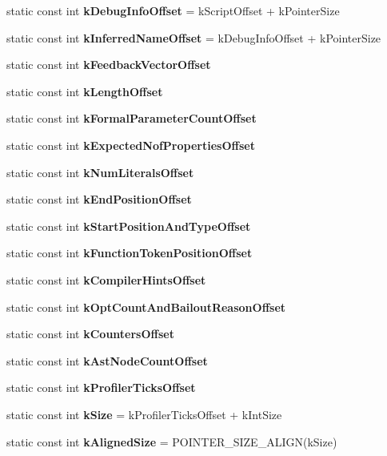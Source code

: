 \begin{DoxyCompactItemize}
\item 
\hypertarget{classv8_1_1internal_1_1_shared_function_info_a3e5e9653b37e7a05aeec489c67aa229a}{}static const int {\bfseries k\+Debug\+Info\+Offset} = k\+Script\+Offset + k\+Pointer\+Size\label{classv8_1_1internal_1_1_shared_function_info_a3e5e9653b37e7a05aeec489c67aa229a}

\item 
\hypertarget{classv8_1_1internal_1_1_shared_function_info_a537a45646dd6c58d4499c13d36239cc6}{}static const int {\bfseries k\+Inferred\+Name\+Offset} = k\+Debug\+Info\+Offset + k\+Pointer\+Size\label{classv8_1_1internal_1_1_shared_function_info_a537a45646dd6c58d4499c13d36239cc6}

\item 
static const int {\bfseries k\+Feedback\+Vector\+Offset}
\item 
static const int {\bfseries k\+Length\+Offset}
\item 
static const int {\bfseries k\+Formal\+Parameter\+Count\+Offset}
\item 
static const int {\bfseries k\+Expected\+Nof\+Properties\+Offset}
\item 
static const int {\bfseries k\+Num\+Literals\+Offset}
\item 
static const int {\bfseries k\+End\+Position\+Offset}
\item 
static const int {\bfseries k\+Start\+Position\+And\+Type\+Offset}
\item 
static const int {\bfseries k\+Function\+Token\+Position\+Offset}
\item 
static const int {\bfseries k\+Compiler\+Hints\+Offset}
\item 
static const int {\bfseries k\+Opt\+Count\+And\+Bailout\+Reason\+Offset}
\item 
static const int {\bfseries k\+Counters\+Offset}
\item 
static const int {\bfseries k\+Ast\+Node\+Count\+Offset}
\item 
static const int {\bfseries k\+Profiler\+Ticks\+Offset}
\item 
\hypertarget{classv8_1_1internal_1_1_shared_function_info_af3f716b004586eba948b0b94c0ad187b}{}static const int {\bfseries k\+Size} = k\+Profiler\+Ticks\+Offset + k\+Int\+Size\label{classv8_1_1internal_1_1_shared_function_info_af3f716b004586eba948b0b94c0ad187b}

\item 
\hypertarget{classv8_1_1internal_1_1_shared_function_info_a9948d887804c3e60228940df82fb1595}{}static const int {\bfseries k\+Aligned\+Size} = P\+O\+I\+N\+T\+E\+R\+\_\+\+S\+I\+Z\+E\+\_\+\+A\+L\+I\+G\+N(k\+Size)\label{classv8_1_1internal_1_1_shared_function_info_a9948d887804c3e60228940df82fb1595}


\end{DoxyCompactItemize}

